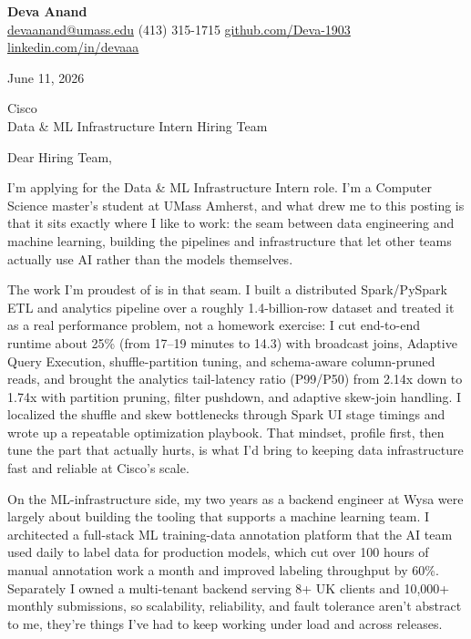 \documentclass[letterpaper,11pt]{article}
\begin{document}
\begin{center}
  {\LARGE \bfseries \textcolor{ResumeNavy}{Deva Anand}} \\[3pt]
  {\small
  \href{mailto:devaanand@umass.edu}{devaanand@umass.edu} \enspace\textbar\enspace
  (413) 315-1715 \enspace\textbar\enspace
  \href{https://github.com/Deva-1903}{github.com/Deva-1903} \enspace\textbar\enspace
  \href{https://linkedin.com/in/devaaa/}{linkedin.com/in/devaaa}}
\end{center}
\vspace{6pt}

June 11, 2026

\vspace{2pt}
Cisco \\
Data \& ML Infrastructure Intern Hiring Team

\vspace{6pt}
Dear Hiring Team,

I'm applying for the Data \& ML Infrastructure Intern role. I'm a Computer Science master's student at UMass Amherst, and what drew me to this posting is that it sits exactly where I like to work: the seam between data engineering and machine learning, building the pipelines and infrastructure that let other teams actually use AI rather than the models themselves.

The work I'm proudest of is in that seam. I built a distributed Spark/PySpark ETL and analytics pipeline over a roughly 1.4-billion-row dataset and treated it as a real performance problem, not a homework exercise: I cut end-to-end runtime about 25\% (from 17--19 minutes to 14.3) with broadcast joins, Adaptive Query Execution, shuffle-partition tuning, and schema-aware column-pruned reads, and brought the analytics tail-latency ratio (P99/P50) from 2.14x down to 1.74x with partition pruning, filter pushdown, and adaptive skew-join handling. I localized the shuffle and skew bottlenecks through Spark UI stage timings and wrote up a repeatable optimization playbook. That mindset, profile first, then tune the part that actually hurts, is what I'd bring to keeping data infrastructure fast and reliable at Cisco's scale.

On the ML-infrastructure side, my two years as a backend engineer at Wysa were largely about building the tooling that supports a machine learning team. I architected a full-stack ML training-data annotation platform that the AI team used daily to label data for production models, which cut over 100 hours of manual annotation work a month and improved labeling throughput by 60\%. Separately I owned a multi-tenant backend serving 8+ UK clients and 10,000+ monthly submissions, so scalability, reliability, and fault tolerance aren't abstract to me, they're things I've had to keep working under load and across releases.
\end{document}
